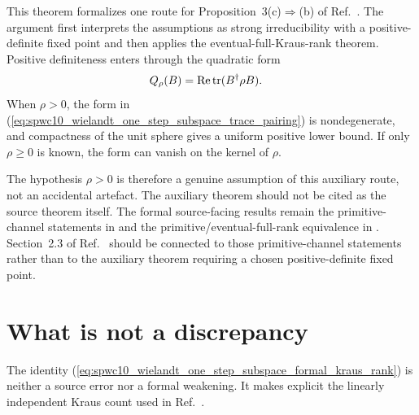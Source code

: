 \documentclass{article}
\begin{document}
This theorem formalizes one route for Proposition~3(c)$\Rightarrow$(b) of
Ref.~\cite{Sanz2010Quantum}. The argument first interprets the assumptions as
strong irreducibility with a positive-definite fixed point and then applies the
eventual-full-Kraus-rank theorem. Positive definiteness enters through the
quadratic form
\begin{align}
    Q_\rho(B)
        &=
        \operatorname{Re}\operatorname{tr}(B^\dagger\rho B).
    \label{eq:spwc10_wielandt_one_step_subspace_trace_pairing}
\end{align}
When $\rho>0$, the form in
(\ref{eq:spwc10_wielandt_one_step_subspace_trace_pairing}) is nondegenerate,
and compactness of the unit sphere gives a uniform positive lower bound. If
only $\rho\geq 0$ is known, the form can vanish on the kernel of $\rho$.

The hypothesis $\rho>0$ is therefore a genuine assumption of this auxiliary
route, not an accidental artefact. The auxiliary theorem should not be cited
as the source theorem itself. The formal source-facing results remain the
primitive-channel statements in
 and the
primitive/eventual-full-rank equivalence in
. Section~2.3 of
Ref.~\cite{Cirac2016MPDO_arXiv} should be connected to those
primitive-channel statements rather than to the auxiliary theorem requiring a
chosen positive-definite fixed point.

\section{What is not a discrepancy}

The identity
(\ref{eq:spwc10_wielandt_one_step_subspace_formal_kraus_rank}) is neither a
source error nor a formal weakening. It makes explicit the linearly independent
Kraus count used in Ref.~\cite{Sanz2010Quantum}.
\end{document}
